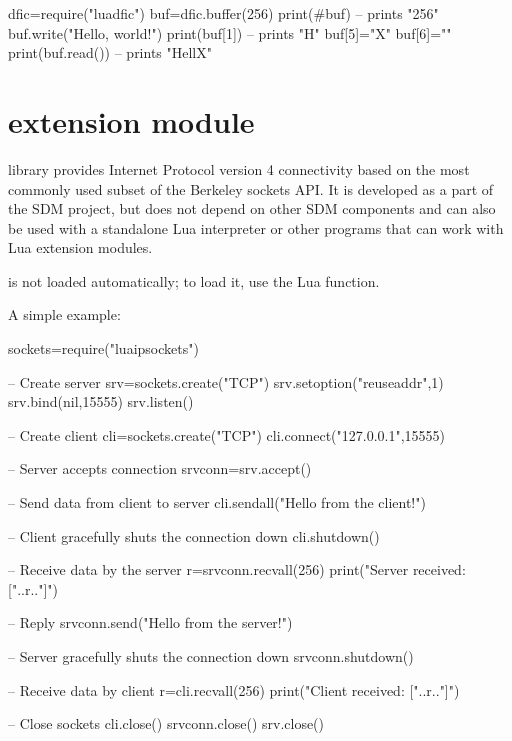 \documentclass[a4paper,12pt,twoside,extrafontsizes]{memoir}
\begin{document}
\begin{shellcmds}\begin{luacode}
dfic=require("luadfic")
buf=dfic.buffer(256)
print(#buf) -- prints "256"
buf.write("Hello, world!")
print(buf[1]) -- prints "H"
buf[5]="X"
buf[6]="\0"
print(buf.read()) -- prints "HellX"
\end{luacode}\end{shellcmds}

\section[luaipsockets extension module]{ extension module}

 library provides Internet Protocol version 4 connectivity based on the most commonly used subset of the Berkeley sockets API. It is developed as a part of the SDM project, but does not depend on other SDM components and can also be used with a standalone Lua interpreter or other programs that can work with Lua extension modules.

 is not loaded automatically; to load it, use the  Lua function.

A simple example:

\begin{breakshellcmds}\begin{luacode}
sockets=require("luaipsockets")

-- Create server
srv=sockets.create("TCP")
srv.setoption("reuseaddr",1)
srv.bind(nil,15555)
srv.listen()

-- Create client
cli=sockets.create("TCP")
cli.connect("127.0.0.1",15555)

-- Server accepts connection
srvconn=srv.accept()

-- Send data from client to server
cli.sendall("Hello from the client!")

-- Client gracefully shuts the connection down
cli.shutdown()

-- Receive data by the server
r=srvconn.recvall(256)
print("Server received: ["..r.."]")

-- Reply
srvconn.send("Hello from the server!")

-- Server gracefully shuts the connection down
srvconn.shutdown()

-- Receive data by client
r=cli.recvall(256)
print("Client received: ["..r.."]")

-- Close sockets
cli.close()
srvconn.close()
srv.close()
\end{luacode}\end{breakshellcmds}
\end{document}
